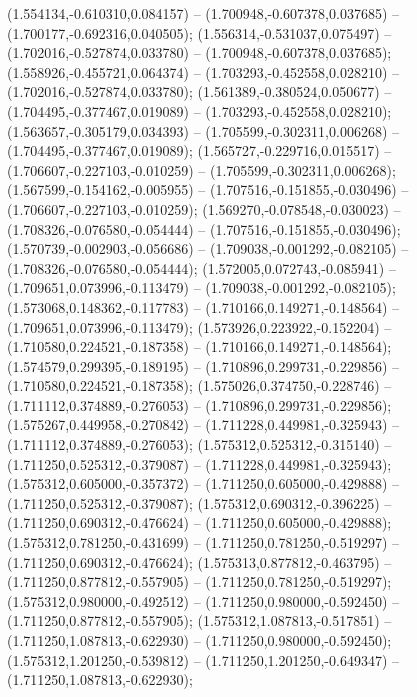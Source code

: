  (1.554134,-0.610310,0.084157) -- (1.700948,-0.607378,0.037685) -- (1.700177,-0.692316,0.040505);
 (1.556314,-0.531037,0.075497) -- (1.702016,-0.527874,0.033780) -- (1.700948,-0.607378,0.037685);
 (1.558926,-0.455721,0.064374) -- (1.703293,-0.452558,0.028210) -- (1.702016,-0.527874,0.033780);
 (1.561389,-0.380524,0.050677) -- (1.704495,-0.377467,0.019089) -- (1.703293,-0.452558,0.028210);
 (1.563657,-0.305179,0.034393) -- (1.705599,-0.302311,0.006268) -- (1.704495,-0.377467,0.019089);
 (1.565727,-0.229716,0.015517) -- (1.706607,-0.227103,-0.010259) -- (1.705599,-0.302311,0.006268);
 (1.567599,-0.154162,-0.005955) -- (1.707516,-0.151855,-0.030496) -- (1.706607,-0.227103,-0.010259);
 (1.569270,-0.078548,-0.030023) -- (1.708326,-0.076580,-0.054444) -- (1.707516,-0.151855,-0.030496);
 (1.570739,-0.002903,-0.056686) -- (1.709038,-0.001292,-0.082105) -- (1.708326,-0.076580,-0.054444);
 (1.572005,0.072743,-0.085941) -- (1.709651,0.073996,-0.113479) -- (1.709038,-0.001292,-0.082105);
 (1.573068,0.148362,-0.117783) -- (1.710166,0.149271,-0.148564) -- (1.709651,0.073996,-0.113479);
 (1.573926,0.223922,-0.152204) -- (1.710580,0.224521,-0.187358) -- (1.710166,0.149271,-0.148564);
 (1.574579,0.299395,-0.189195) -- (1.710896,0.299731,-0.229856) -- (1.710580,0.224521,-0.187358);
 (1.575026,0.374750,-0.228746) -- (1.711112,0.374889,-0.276053) -- (1.710896,0.299731,-0.229856);
 (1.575267,0.449958,-0.270842) -- (1.711228,0.449981,-0.325943) -- (1.711112,0.374889,-0.276053);
 (1.575312,0.525312,-0.315140) -- (1.711250,0.525312,-0.379087) -- (1.711228,0.449981,-0.325943);
 (1.575312,0.605000,-0.357372) -- (1.711250,0.605000,-0.429888) -- (1.711250,0.525312,-0.379087);
 (1.575312,0.690312,-0.396225) -- (1.711250,0.690312,-0.476624) -- (1.711250,0.605000,-0.429888);
 (1.575312,0.781250,-0.431699) -- (1.711250,0.781250,-0.519297) -- (1.711250,0.690312,-0.476624);
 (1.575313,0.877812,-0.463795) -- (1.711250,0.877812,-0.557905) -- (1.711250,0.781250,-0.519297);
 (1.575312,0.980000,-0.492512) -- (1.711250,0.980000,-0.592450) -- (1.711250,0.877812,-0.557905);
 (1.575312,1.087813,-0.517851) -- (1.711250,1.087813,-0.622930) -- (1.711250,0.980000,-0.592450);
 (1.575312,1.201250,-0.539812) -- (1.711250,1.201250,-0.649347) -- (1.711250,1.087813,-0.622930);
